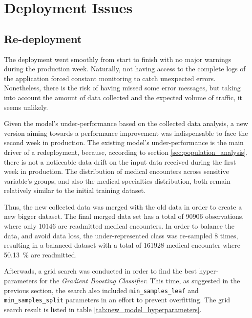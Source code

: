 \documentclass[a4paper,11pt]{article}
\begin{document}
\newpage
\section{Deployment Issues}
\subsection{Re-deployment}

The deployment went smoothly from start to finish with no major warnings during the production week. Naturally, not having access to the complete logs of the application forced constant monitoring to catch unexpected errors. Nonetheless, there is the risk of having missed some error messages, but taking into account the amount of data collected and the expected volume of traffic, it seems unlikely.

Given the model's under-performance based on the collected data analysis, a new version aiming towards a performance improvement was indispensable to face the second week in production. The existing model's under-performance is the main driver of a redeployment, because, according to section \ref{sec:population_analysis}, there is not a noticeable data drift on the input data received during the first week in production. The distribution of medical encounters across sensitive variable's groups, and also the medical specialties distribution, both remain relatively similar to the initial training dataset.

Thus, the new collected data was merged with the old data in order to create a new bigger dataset. The final merged data set has a total of \SI{90906}{} observations, where only \SI{10146}{} are readmitted medical encounters.
In order to balance the data, and avoid data loss, the under-represented class was re-sampled \SI{8}{} times, resulting in a balanced dataset with a total of \SI{161928}{} medical encounter where \SI{50.13}{\percent} are readmitted.

Afterwads, a grid search was conducted in order to find the best hyper-parameters for the \textit{Gradient Boosting Classifier}. This time, as suggested in the previous section, the search also included \texttt{min\_samples\_leaf} and \texttt{min\_samples\_split} parameters in an effort to prevent overfitting. The grid search result is listed in table \ref{tab:new_model_hyperparameters}.
\end{document}
